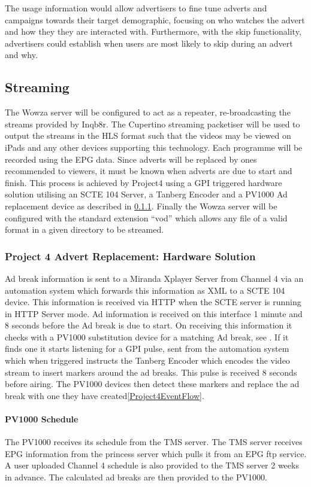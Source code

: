 The usage information would allow advertisers to fine tune adverts and campaigns towards their target demographic, focusing on who watches the advert and how they they are interacted with. Furthermore, with the skip functionality, advertisers could establish when users are most likely to skip during an advert and why.


\subsection{Streaming}
The Wowza server will be configured to act as a repeater, re-broadcasting the streams provided by Inqb8r. The Cupertino streaming packetiser will be used to output the streams in the HLS format such that the videos may be viewed on iPads and any other devices supporting this technology. Each programme will be recorded using the EPG data. Since adverts will be replaced by ones recommended to viewers, it must be known when adverts are due to start and finish. This process is achieved by Project4 using a GPI\citep{SCTE104} triggered hardware solution utilising an SCTE 104 Server, a Tanberg Encoder and a PV1000 Ad replacement device as described in \ref{subsubsec:Project4Tech}. Finally the Wowza server will be configured with the standard extension ``vod'' which allows any file of a valid format in a given directory to be streamed.

\subsubsection{Project 4 Advert Replacement: Hardware Solution}\label{subsubsec:Project4Tech}
Ad break information is sent to a Miranda Xplayer Server from Channel 4 via an automation system which forwards this information as XML to a SCTE 104 device. This information is received via HTTP when the SCTE server is running in HTTP Server mode. Ad information is received on this interface 1 minute and 8 seconds before the Ad break is due to start. On receiving this information it checks with a PV1000 substitution device for a matching Ad break, see \citep{PV1000Schedule}. If it finds one it starts listening for a GPI pulse, sent from the automation system which when triggered instructs the Tanberg Encoder which encodes the video stream to insert markers around the ad breaks. This pulse is received 8 seconds before airing. The PV1000 devices then detect these markers and replace the ad break with one they have created\ref{Project4EventFlow}.

\paragraph{PV1000 Schedule}\label{PV1000Schedule}
The PV1000 receives its schedule from the TMS server. The TMS server receives EPG information from the princess server which pulls it from an EPG ftp service. A user uploaded Channel 4 schedule is also provided to the TMS server 2 weeks in advance. The calculated ad breaks are then provided to the PV1000.

